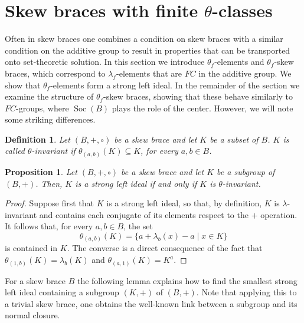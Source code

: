 \documentclass{amsart}
\newcommand{\Soc}{\operatorname{Soc}}
\newtheorem{pro}[thm]{Proposition}
\newtheorem{defn}[thm]{Definition}
\begin{document}
\section{Skew braces with finite \texorpdfstring{$\theta$}{lambda}-classes}\label{sectheta}

Often in skew braces one combines a condition on skew braces with a similar condition on the additive group to result in properties that can be transported onto set-theoretic solution. In this section we introduce $\theta_f$-elements and $\theta_f$-skew braces, which correspond to $\lambda_f$-elements that are $FC$ in the additive group. We show that $\theta_f$-elements form a strong left ideal. In the remainder of the section we examine the structure of $\theta_f$-skew braces, showing that these behave similarly to $FC$-groups, where $\Soc(B)$ plays the role of the center. However, we will note some striking differences.

\begin{defn}
    Let $(B,+,\circ)$ be a skew brace and let $K$ be a subset of $B$. $K$ is called \emph{$\theta$-invariant} if $\theta_{(a,b)}(K)\subseteq K$, for every $a,b\in B$.
\end{defn}

\begin{pro}
    Let $(B,+,\circ)$ be a skew brace and let $K$ be a subgroup of $(B,+)$. Then, $K$ is a strong left ideal if and only if $K$ is $\theta$-invariant.
\end{pro}
\begin{proof}
    Suppose first that $K$ is a strong left ideal, so that, by definition, $K$ is $\lambda$-invariant and contains each conjugate of its elements respect to the $+$ operation. It follows that, for every $a,b\in B$, the set $$\theta_{(a,b)}(K)=\{a+\lambda_b(x)-a\mid x \in K\}$$ is contained in $K$. The converse is a direct consequence of the fact that $\theta_{(1,b)}(K)=\lambda_b(K)$ and $\theta_{(a,1)}(K)=K^a$.
\end{proof}

For a skew brace $B$ the following lemma explains how to find the smallest strong left ideal containing a subgroup $(K,+)$ of $(B,+)$. Note that applying this to a trivial skew brace, one obtains the well-known link between a subgroup and its normal closure.
\end{document}
